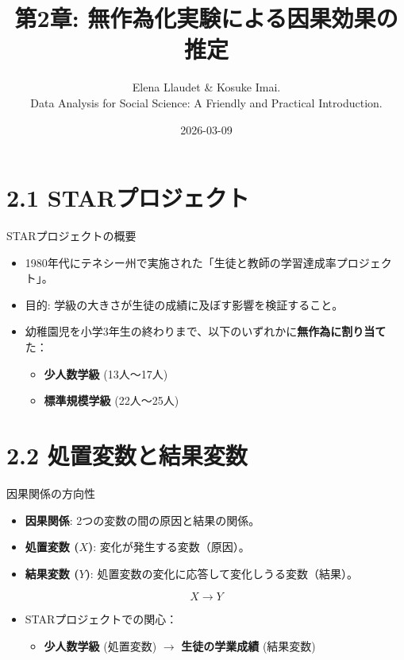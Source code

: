 \documentclass[
  ignorenonframetext,
]{beamer}
\title{第2章: 無作為化実験による因果効果の推定}
\subtitle{Elena Llaudet \& Kosuke Imai.\\
Data Analysis for Social Science: A Friendly and Practical
Introduction.}
\author{}
\date{\vspace{-2.5em}2026-03-09}
\providecommand{\tightlist}{%
  \setlength{\itemsep}{0pt}\setlength{\parskip}{0pt}}
\begin{document}
\frame{\titlepage}

\hypertarget{starux30d7ux30edux30b8ux30a7ux30afux30c8}{%
\section{2.1
STARプロジェクト}\label{starux30d7ux30edux30b8ux30a7ux30afux30c8}}

\begin{frame}{STARプロジェクトの概要}
\protect\hypertarget{starux30d7ux30edux30b8ux30a7ux30afux30c8ux306eux6982ux8981}{}
\begin{itemize}
\tightlist
\item
  1980年代にテネシー州で実施された「生徒と教師の学習達成率プロジェクト」。
\item
  目的: 学級の大きさが生徒の成績に及ぼす影響を検証すること。
\item
  幼稚園児を小学3年生の終わりまで、以下のいずれかに\textbf{無作為に割り当て}た：

  \begin{itemize}
  \tightlist
  \item
    \textbf{少人数学級} (13人〜17人)
  \item
    \textbf{標準規模学級} (22人〜25人)
  \end{itemize}
\end{itemize}
\end{frame}

\hypertarget{ux51e6ux7f6eux5909ux6570ux3068ux7d50ux679cux5909ux6570}{%
\section{2.2
処置変数と結果変数}\label{ux51e6ux7f6eux5909ux6570ux3068ux7d50ux679cux5909ux6570}}

\begin{frame}{因果関係の方向性}
\protect\hypertarget{ux56e0ux679cux95a2ux4fc2ux306eux65b9ux5411ux6027}{}
\begin{itemize}
\tightlist
\item
  \textbf{因果関係}: 2つの変数の間の原因と結果の関係。
\item
  \textbf{処置変数 (\(X\))}: 変化が発生する変数（原因）。
\item
  \textbf{結果変数 (\(Y\))}:
  処置変数の変化に応答して変化しうる変数（結果）。
\end{itemize}

\[ X \rightarrow Y \]

\begin{itemize}
\tightlist
\item
  STARプロジェクトでの関心：

  \begin{itemize}
  \tightlist
  \item
    \textbf{少人数学級} (処置変数) \(\rightarrow\)
    \textbf{生徒の学業成績} (結果変数)
  \end{itemize}
\end{itemize}
\end{frame}
\end{document}

